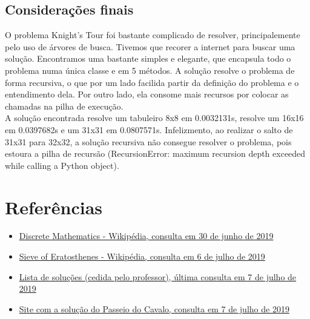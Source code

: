 \documentclass{article}
\begin{document}
    \subsection{Considerações finais}
    O problema Knight's Tour foi bastante complicado de resolver, principalemente pelo uso de árvores de busca. Tivemos que recorer a internet para buscar uma solução. Encontramos uma bastante simples e elegante, que encapsula todo o problema numa única classe e em 5 métodos. A solução resolve o problema de forma recursiva, o que por um lado facilida partir da definição do problema e o entendimento dela. Por outro lado, ela consome mais recursos por colocar as chamadas na pilha de execução.\\
    A solução encontrada resolve um tabuleiro 8x8 em 0.0032131s, resolve um 16x16 em 0.0397682s e um 31x31 em 0.0807571s. Infelizmento, ao realizar o salto de 31x31 para 32x32, a solução recursiva não consegue resolver o problema, pois estoura a pilha de recursão (RecursionError: maximum recursion depth exceeded while calling a Python object).


\section{Referências}
    \begin{itemize}
      \item \href{https://en.wikipedia.org/wiki/Discrete_mathematics}{Discrete Mathematics - Wikipédia, consulta em 30 de junho de 2019}
      \item \href{https://en.wikipedia.org/wiki/Sieve_of_Eratosthenes}{Sieve of Eratosthenes - Wikipédia, consulta em 6 de julho de 2019}
      \item \href{https://github.com/nayuki/Project-Euler-solutions/blob/master/Answers.txt}{Lista de soluções (cedida pelo professor), última consulta em 7 de julho de 2019}
      \item \href{http://blog.justsophie.com/algorithm-for-knights-tour-in-python/}{Site com a solução do Passeio do Cavalo, consulta em 7 de julho de 2019}
    \end{itemize}
\end{document}
